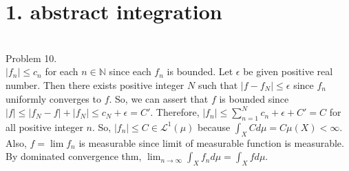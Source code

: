 \section*{1. abstract integration} \hfill \\

Problem 10. \\

$\left | f_n \right | \leq c_n$ for each $n \in \mathbb{N}$ since each $f_n$ is bounded.
Let $\epsilon$ be given positive real number.
Then there exists positive integer $N$ such that $\left | f - f_N \right | \leq \epsilon$ since $f_n$ uniformly converges to $f$.
So, we can assert that $f$ is bounded since $\left | f \right | \leq \left | f_N - f \right | + \left | f_N \right | \leq c_N + \epsilon = C'$.
Therefore, $\left | f_n \right | \leq \sum_{n=1}^N c_n + \epsilon + C' = C$ for all positive integer $n$.
So, $\left | f_n \right | \leq C \in \mathcal{L}^1(\mu)$ because $\int _X C d\mu = C\mu(X) < \infty$.
Also, $f = \lim f_n$ is measurable since limit of measurable function is measurable.
By dominated convergence thm, $\lim_{n \rightarrow \infty} \int_X f_n d\mu = \int_X f d\mu$.

